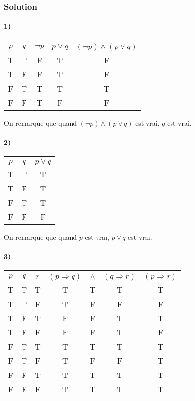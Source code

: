     \subsubsection{Solution}
    
    \paragraph{1)}
    \begin{center}
	\begin{tabular}{cc|ccc}
		$p$ & $q$ & $\lnot p$ & $p \lor q$ & $(\lnot p) \land (p \lor q)$ \\
		\hline
		T&T&F&T&F\\
		T&F&F&T&F\\
		F&\color{red}T&T&T&\color{red}T\\
		F&F&T&F&F\\
	\end{tabular}
    \end{center}
    
    On remarque que quand $(\lnot p) \land (p \lor q)$ est vrai, $q$ est vrai.
    
    \paragraph{2)}
    \begin{center}
    	\begin{tabular}{cc|c}
    		$p$ & $q$ & $p \lor q$ \\
    		\hline
    		\color{red}T&T&\color{red}T\\
    		\color{red}T&F&\color{red}T\\
    		F&T&T\\
    		F&F&F\\
    	\end{tabular}
    \end{center}
    
    On remarque que quand $p$ est vrai, $p \lor q$ est vrai.
    
    \paragraph{3)}
    \begin{center}
    	\begin{tabular}{ccc|cccc}
    		$p$ & $q$ & $r$ & $(p \Rightarrow q)$ & $\land$ & $(q \Rightarrow r)$ & $(p \Rightarrow r)$ \\
    		\hline
    		T&T&T&T&\color{red}T&T&\color{red}T\\
    		T&T&F&T&F&F&F\\
    		T&F&T&F&F&T&T\\
    		T&F&F&F&F&T&F\\
    		F&T&T&T&\color{red}T&T&\color{red}T\\
    		F&T&F&T&F&F&T\\
    		F&F&T&T&\color{red}T&T&\color{red}T\\
    		F&F&F&T&\color{red}T&T&\color{red}T\\
    	\end{tabular}
    \end{center}
    
